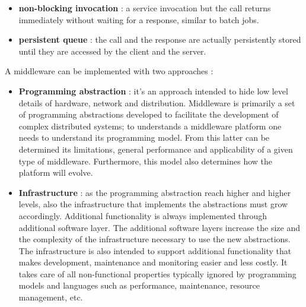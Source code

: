 \documentclass[11pt]{article}
\begin{document}
\begin{itemize}
\begin{itemize}
\item \textbf{non-blocking invocation} : a service invocation but the call returns immediately without waiting for a response, similar to batch jobs.
\item \textbf{persistent queue} : the call and the response are actually persistently stored until they are accessed by the client and the server.
\end{itemize}
\end{itemize}
A middleware can be implemented with two approaches :
\begin{itemize}
\item \textbf{Programming abstraction} : it's an approach intended to hide low level details of hardware, network and distribution. Middleware is primarily a set of programming abstractions developed to facilitate the development of complex distributed systems; to understands a middleware platform one needs to understand its programming model. From this latter can be determined its limitations, general performance and applicability of a given type of middleware. Furthermore, this model also determines how the platform will evolve.
\item \textbf{Infrastructure} : as the programming abstraction reach higher and higher levels, also the infrastructure that implements the abstractions must grow accordingly. Additional functionality is always implemented through additional software layer. The additional software layers increase the size and the complexity of the infrastructure necessary to use the new abstractions. The infrastructure is also intended to support additional functionality that makes development, maintenance and monitoring easier and less costly. It takes care of all non-functional properties typically ignored by programming models and languages such as performance, maintenance, resource management, etc.
\end{itemize}
\end{document}
